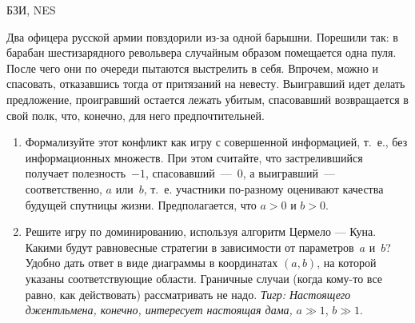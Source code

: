 \begin{problem}
\begin{source}
БЗИ, NES
\end{source}
 Два офицера русской армии
повздорили из-за одной барышни. Порешили так: в барабан
шестизарядного револьвера случайным образом помещается одна
пуля. После чего они по очереди пытаются выстрелить в себя.
Впрочем, можно и спасовать, отказавшись тогда от притязаний
на невесту. Выигравший идет делать предложение, проигравший
остается лежать убитым, спасовавший возвращается в свой
полк, что, конечно, для него предпочтительней.

\begin{enumerate}

\item Формализуйте этот конфликт как игру с {\rm
совершенной информацией}, т.~е., без информационных
множеств. При этом считайте, что застрелившийся получает
полезность~$-1$, спасовавший~—~$0$, а выигравший~—
соответственно, $a$ или~$b$, т.~е. участники по-разному
оценивают качества будущей спутницы жизни.
Предполагается, что $a>0$ и $b>0$.

\item  Решите игру по доминированию, используя алгоритм
Цермело — Куна. Какими будут равновесные стратегии в
зависимости от параметров~$a$ и~$b$? Удобно дать ответ в
виде диаграммы в координатах $(a,b)$, на которой указаны
соответствующие области. Граничные случаи (когда кому-то
все равно, как действовать) рассматривать не надо.
{\it Тигр: Настоящего джентльмена, конечно, интересует настоящая дама, } $a\gg 1$, $b\gg 1$.

\end{enumerate}




\end{problem}
